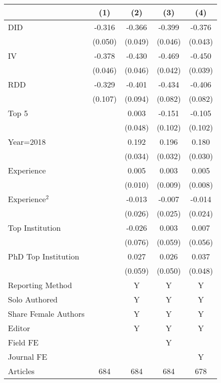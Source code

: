 \begin{tabular}{l*{4}{c}}
\hline\hline
                &\multicolumn{1}{c}{(1)}&\multicolumn{1}{c}{(2)}&\multicolumn{1}{c}{(3)}&\multicolumn{1}{c}{(4)}\\
\hline
DID             &   -0.316&   -0.366&   -0.399&   -0.376\\
                &  (0.050)&  (0.049)&  (0.046)&  (0.043)\\
IV              &   -0.378&   -0.430&   -0.469&   -0.450\\
                &  (0.046)&  (0.046)&  (0.042)&  (0.039)\\
RDD             &   -0.329&   -0.401&   -0.434&   -0.406\\
                &  (0.107)&  (0.094)&  (0.082)&  (0.082)\\
Top 5           &         &    0.003&   -0.151&   -0.105\\
                &         &  (0.048)&  (0.102)&  (0.102)\\
Year=2018       &         &    0.192&    0.196&    0.180\\
                &         &  (0.034)&  (0.032)&  (0.030)\\
Experience      &         &    0.005&    0.003&    0.005\\
                &         &  (0.010)&  (0.009)&  (0.008)\\
Experience$^2$  &         &   -0.013&   -0.007&   -0.014\\
                &         &  (0.026)&  (0.025)&  (0.024)\\
Top Institution &         &   -0.026&    0.003&    0.007\\
                &         &  (0.076)&  (0.059)&  (0.056)\\
PhD Top Institution&         &    0.027&    0.026&    0.037\\
                &         &  (0.059)&  (0.050)&  (0.048)\\
Reporting Method &         &        Y&        Y&        Y\\
Solo Authored   &         &        Y&        Y&        Y\\
Share Female Authors &         &        Y&        Y&        Y\\
Editor          &         &        Y&        Y&        Y\\
Field FE        &         &         &        Y&         \\
Journal FE      &         &         &         &        Y\\
\hline
Articles        &      684&      684&      684&      678\\
\hline\hline
\end{tabular}
